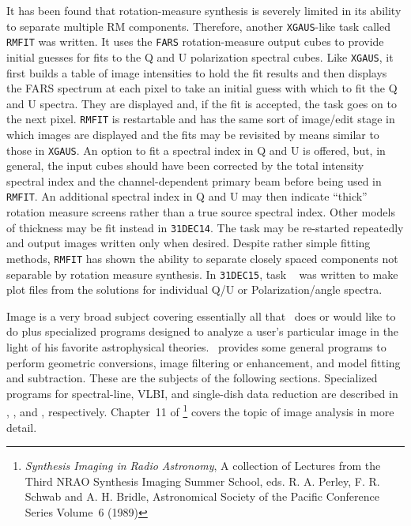      It has been found that rotation-measure synthesis is severely
limited in its ability to separate multiple RM components.  Therefore,
another {\tt XGAUS}-like task called {\tt RMFIT} was written.  It uses
the {\tt FARS} rotation-measure output cubes to provide initial
guesses for fits to the Q and U polarization spectral cubes.  Like
{\tt XGAUS}, it first builds a table of image intensities to hold the
fit results and then displays the FARS spectrum at each pixel to take
an initial guess with which to fit the Q and U spectra.  They are
displayed and, if the fit is accepted, the task goes on to the next
pixel.  {\tt RMFIT} is restartable and has the same sort of image/edit
stage in which images are displayed and the fits may be revisited by
means similar to those in {\tt XGAUS}\@.  An option to fit a spectral
index in Q and U is offered, but, in general, the input cubes should
have been corrected by the total intensity spectral index and the
channel-dependent primary beam before being used in {\tt RMFIT}\@.  An
additional spectral index in Q and U may then indicate ``thick''
rotation measure screens rather than a true source spectral index.
Other models of thickness may be fit instead in {\tt 31DEC14}\@.  The
task may be re-started repeatedly and output images written only when
desired.  Despite rather simple fitting methods, {\tt RMFIT} has shown
the ability to separate closely spaced components not separable by
rotation measure synthesis.  In {\tt 31DEC15}, task {\tt
{}} was written to make plot files from the solutions for
individual Q/U or Polarization/angle spectra.

{}

     Image  is a very broad subject covering
essentially all that \AIPS\ does or would like to do plus specialized
programs designed to analyze a user's particular image in the light of
his favorite astrophysical theories.  \AIPS\ provides some general
programs to perform geometric conversions, image filtering or
enhancement, and model fitting and subtraction.  These are the
subjects of the following sections. Specialized programs for
spectral-line, VLBI, and single-dish data reduction are described in
, , and , respectively.  Chapter~11
of {\it {}\/}\footnote{{\it
Synthesis Imaging in Radio Astronomy\/}, A collection of Lectures from
the Third NRAO Synthesis Imaging Summer School, eds. R. A. Perley, F.
R. Schwab and A. H. Bridle, Astronomical Society of the Pacific
Conference Series Volume~6 (1989)} covers the topic of image analysis
in more detail.

